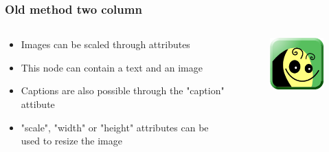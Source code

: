 \documentclass[usepdftitle=false,professionalfonts,compress ]{beamer}
\begin{document}
{
\begin{frame}\frametitle{Old method two column}
\begin{columns}
	\begin{column}{0.65\textwidth}


	\begin{itemize}

	\item Images can be scaled through attributes

			\item This node can contain a text and an image

			\item Captions are also possible through the "caption" attibute

			\item "scale", "width" or "height" attributes can be used to resize the image

				\end{itemize}
	\end{column}
\begin{column}{0.53\textwidth}

\begin{figure}
	\includegraphics[width=.97\textwidth]{freeplane-logo-2014.png}\end{figure}\end{column}
\end{columns}

\end{frame}
}
\end{document}
